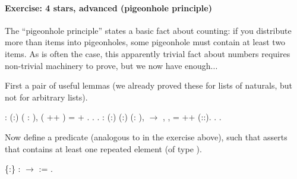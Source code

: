 \documentclass[12pt]{report}
\begin{document}
\paragraph{Exercise: 4 stars, advanced (pigeonhole principle)}

 The ``pigeonhole principle'' states a basic fact about counting:
   if you distribute more than  items into  pigeonholes, some 
   pigeonhole must contain at least two items.  As is often the case,
   this apparently trivial fact about numbers requires non-trivial
   machinery to prove, but we now have enough... 

 First a pair of useful lemmas (we already proved these for lists
    of naturals, but not for arbitrary lists). \begin{coqdoccode}
\coqdocemptyline
\coqdocnoindent
{}  : \coqdockw{\ensuremath{\forall}} (:) (  :  ),\coqdoceol
\coqdocindent{1.00em}
 ( ++ ) =   +  .\coqdoceol
\coqdocnoindent
{}.\coqdoceol
 .\coqdoceol
\coqdocemptyline
\coqdocnoindent
{}  : \coqdockw{\ensuremath{\forall}} (:) (:) (: ),\coqdoceol
\coqdocindent{1.00em}
   \ensuremath{\rightarrow} \coqdoceol
\coqdocindent{1.00em}
\coqdoctac{\ensuremath{\exists}} , \coqdoctac{\ensuremath{\exists}} ,  =  ++ (::).\coqdoceol
\coqdocnoindent
{}.\coqdoceol
 .\coqdoceol
\coqdocemptyline
\end{coqdoccode}
Now define a predicate  (analogous to  in the
   exercise above), such that    asserts that  contains
   at least one repeated element (of type ).  \begin{coqdoccode}
\coqdocemptyline
\coqdocnoindent
{}  \{:\} :   \ensuremath{\rightarrow}  :=\coqdoceol
\coqdocindent{1.00em}
\coqdoceol
\coqdocnoindent
.\coqdoceol
\coqdocemptyline
\end{coqdoccode}
\end{document}
